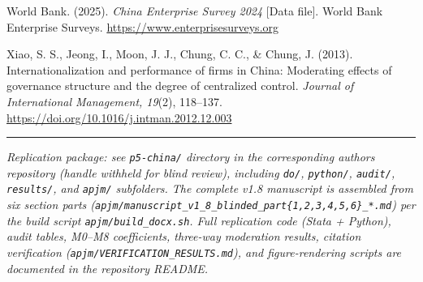 \documentclass[12pt,a4paper]{article}
\begin{document}
World Bank. (2025). \emph{China Enterprise Survey 2024} {[}Data file{]}.
World Bank Enterprise Surveys. \url{https://www.enterprisesurveys.org}

Xiao, S. S., Jeong, I., Moon, J. J., Chung, C. C., \& Chung, J. (2013).
Internationalization and performance of firms in China: Moderating
effects of governance structure and the degree of centralized control.
\emph{Journal of International Management, 19}(2), 118--137.
\url{https://doi.org/10.1016/j.intman.2012.12.003}

\begin{center}\rule{0.5\linewidth}{0.5pt}\end{center}

\emph{Replication package: see \texttt{p5-china/} directory in the
corresponding author\textquotesingle s repository (handle withheld for
blind review), including \texttt{do/}, \texttt{python/},
\texttt{audit/}, \texttt{results/}, and \texttt{apjm/} subfolders. The
complete v1.8 manuscript is assembled from six section parts
(\texttt{apjm/manuscript\_v1\_8\_blinded\_part\{1,2,3,4,5,6\}\_*.md})
per the build script \texttt{apjm/build\_docx.sh}. Full replication code
(Stata + Python), audit tables, M0--M8 coefficients, three-way
moderation results, citation verification
(\texttt{apjm/VERIFICATION\_RESULTS.md}), and figure-rendering scripts
are documented in the repository README.}
\end{document}
